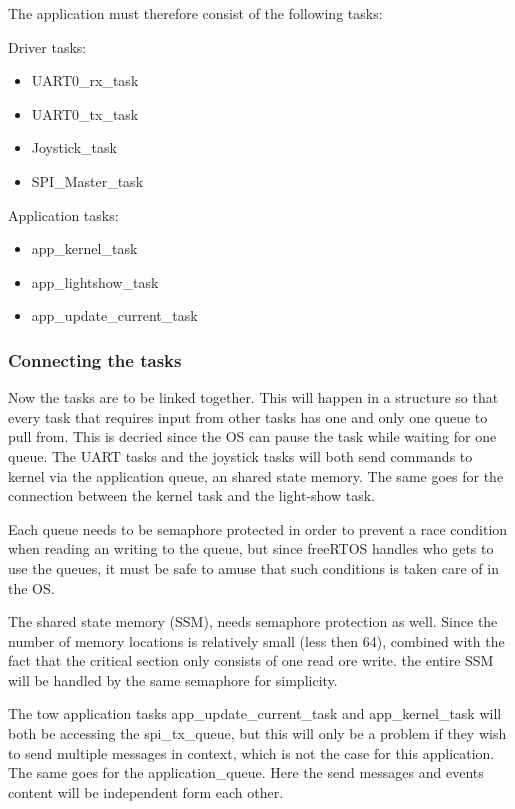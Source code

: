 The application must therefore consist of the following tasks:

Driver tasks:
\begin{itemize}[noitemsep]
	\item UART0\_rx\_task
	\item UART0\_tx\_task
	\item Joystick\_task
	\item SPI\_Master\_task
\end{itemize}

Application tasks:
\begin{itemize}[noitemsep]
	\item app\_kernel\_task
	\item app\_lightshow\_task
	\item app\_update\_current\_task
\end{itemize}	
	
\subsubsection{Connecting the tasks}
Now the tasks are to be linked together. This will happen in a structure so that every task that requires input from other tasks has one and only one queue to pull from. This is decried since the OS can pause the task while waiting for one queue. The UART tasks and the joystick tasks will both send commands to kernel via the application queue, an shared state memory. The same goes for the connection between the kernel task and the light-show task. 

Each queue needs to be semaphore protected in order to prevent a race condition when reading an writing to the queue, but since freeRTOS handles who gets to use the queues, it must be safe to amuse that such conditions is taken care of in the OS. 

The shared state memory (SSM), needs semaphore protection as well. Since the number of memory locations is relatively small (less then 64), combined with the fact that the critical section only consists of one read ore write. the entire SSM will be handled by the same semaphore for simplicity. 

The tow application tasks app\_update\_current\_task and app\_kernel\_task will both be accessing the spi\_tx\_queue, but this will only be a problem if they wish to send multiple messages in context, which is not the case for this application. The same goes for the application\_queue. Here the send messages and events content will be independent form each other.  

